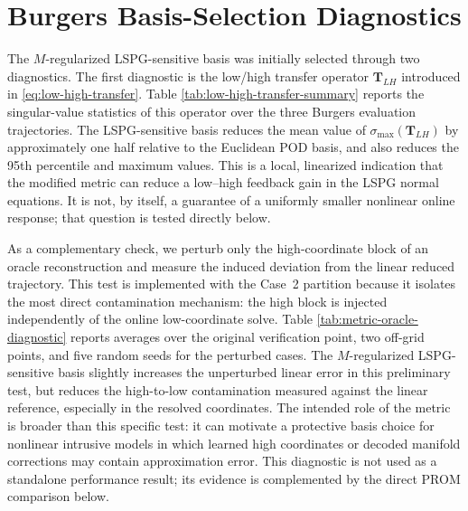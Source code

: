 \documentclass[11pt]{article}
\begin{document}
\section{Burgers Basis-Selection Diagnostics}
\label{app:basis-selection-diagnostics}

The $M$-regularized LSPG-sensitive basis was initially selected through two
diagnostics.
The first diagnostic is the low/high transfer operator
$\mathbf T_{LH}$ introduced in \eqref{eq:low-high-transfer}.  Table
\ref{tab:low-high-transfer-summary} reports the singular-value statistics of
this operator over the three Burgers evaluation trajectories.  The
LSPG-sensitive basis reduces the mean value of
$\sigma_{\max}(\mathbf T_{LH})$ by approximately one half relative to the
Euclidean POD basis, and also reduces the 95th percentile and maximum values.
This is a local, linearized indication that the modified metric can reduce a
low--high feedback gain in the LSPG normal equations.  It is not, by itself,
a guarantee of a uniformly smaller nonlinear online response; that question
is tested directly below.

\begin{table}[H]
\centering
\caption{Burgers low/high transfer diagnostic for basis selection. The table reports statistics of $\sigma_{\max}(\mathbf T_{LH})$ and of the corresponding $M$-weighted state gain $g_M$ over the original three evaluation trajectories.}
\label{tab:low-high-transfer-summary}
\resizebox{\textwidth}{!}{%

}
\end{table}

As a complementary check, we perturb only the high-coordinate block of an
oracle reconstruction and measure the induced deviation from the linear
reduced trajectory.  This test is implemented with the Case~2 partition because
it isolates the most direct contamination mechanism: the high block is injected
independently of the online low-coordinate solve.  Table
\ref{tab:metric-oracle-diagnostic} reports averages over the original
verification point, two off-grid points, and five random seeds for the
perturbed cases.
The $M$-regularized LSPG-sensitive basis slightly increases the unperturbed
linear error in this preliminary test, but reduces the high-to-low
contamination measured against the linear reference, especially in the
resolved coordinates.  The intended role of the metric is broader than this
specific test: it can motivate a protective basis choice for nonlinear
intrusive models in which learned high coordinates or decoded manifold
corrections may contain approximation error.  This diagnostic is not used as
a standalone performance result; its evidence is complemented by the direct
PROM comparison below.
\end{document}
